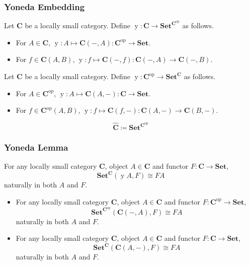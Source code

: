 \documentclass[UTF8,11pt,colorlinks,compress,openany]{beamer}%
\begin{document}
\begin{frame}\frametitle{Yoneda Embedding}
\begin{definition}
	Let $\mathbf{C}$ be a locally small category. Define $\operatorname{y}:\mathbf{C}\to\mathbf{Set}^{\mathbf{C}^\mathrm{op}}$ as follows.
\begin{itemize}
	\item For $A\in\mathbf{C}$, $\operatorname{y}: A\mapsto\mathbf{C}(-,A):\mathbf{C}^\mathrm{op}\to\mathbf{Set}$.
	\item For $f\in\mathbf{C}(A,B)$, $\operatorname{y}: f\mapsto\mathbf{C}(-,f): \mathbf{C}(-,A)\to\mathbf{C}(-,B)$.
\end{itemize}
\end{definition}
\begin{definition}
	Let $\mathbf{C}$ be a locally small category. Define $\operatorname{y}:\mathbf{C}^\mathrm{op}\to\mathbf{Set}^\mathbf{C}$ as follows.
\begin{itemize}
	\item For $A\in\mathbf{C}^\mathrm{op}$, $\operatorname{y}: A\mapsto\mathbf{C}(A,-):\mathbf{C}\to\mathbf{Set}$.
	\item For $f\in\mathbf{C}^\mathrm{op}(A,B)$, $\operatorname{y}: f\mapsto\mathbf{C}(f,-): \mathbf{C}(A,-)\to\mathbf{C}(B,-)$.
\end{itemize}
\end{definition}
\[\widehat{\mathbf{C}}\coloneqq\mathbf{Set}^{\mathbf{C}^\mathrm{op}}\]
\end{frame}

\begin{frame}\frametitle{Yoneda Lemma}
\begin{theorem}
	For any locally small category $\mathbf{C}$, object $A\in\mathbf{C}$ and functor $F: \mathbf{C}\to\mathbf{Set}$,
	\[
		\mathbf{Set}^\mathbf{C}(\operatorname{y}A,F)\cong FA
	\]
	naturally in both $A$ and $F$.
\end{theorem}
\begin{theorem}
\begin{itemize}
	\item For any locally small category $\mathbf{C}$, object $A\in\mathbf{C}$ and functor $F: \mathbf{C}^\mathrm{op}\to\mathbf{Set}$,
	\[
		\mathbf{Set}^{\mathbf{C}^\mathrm{op}}(\mathbf{C}(-,A),F)\cong FA
	\]
	naturally in both $A$ and $F$.
	\item For any locally small category $\mathbf{C}$, object $A\in\mathbf{C}$ and functor $F: \mathbf{C}\to\mathbf{Set}$,
	\[
		\mathbf{Set}^\mathbf{C}(\mathbf{C}(A,-),F)\cong FA
	\]
	naturally in both $A$ and $F$.
\end{itemize}
\end{theorem}
\end{frame}
\end{document}
